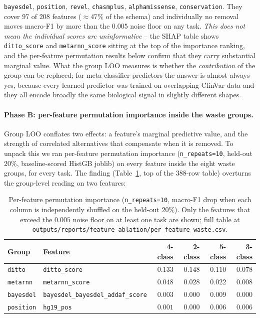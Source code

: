 \documentclass[11pt,a4paper]{article}
\begin{document}
\begin{enumerate}[leftmargin=*]
          \texttt{bayesdel}, \texttt{position}, \texttt{revel},
          \texttt{chasmplus}, \texttt{alphamissense}, \texttt{conservation}.
          They cover $97$ of $208$ features ($\approx 47\%$ of the schema)
          and individually no removal moves macro-F1 by more than the
          $0.005$ noise floor on any task. \emph{This does not mean the
          individual scores are uninformative} -- the SHAP table shows
          \texttt{ditto\_score} and \texttt{metarnn\_score} sitting at
          the top of the importance ranking, and the per-feature
          permutation results below confirm that they carry substantial
          marginal value. What the group LOO measures is whether the
          \emph{contribution} of the group can be replaced; for
          meta-classifier predictors the answer is almost always yes,
          because every learned predictor was trained on overlapping
          ClinVar data and they all encode broadly the same biological
          signal in slightly different shapes.
\end{enumerate}

\paragraph{Phase B: per-feature permutation importance inside the waste groups.}
Group LOO conflates two effects: a feature's marginal predictive value,
and the strength of correlated alternatives that compensate when it is
removed. To unpack this we ran per-feature permutation importance
(\texttt{n\_repeats=10}, held-out 20\%, baseline-scored HistGB joblib)
on every feature inside the eight waste groups, for every task. The
finding (Table~\ref{tab:ablation-perfeat}, top of the $388$-row table)
overturns the group-level reading on two features:

\begin{table}[H]
\centering
\caption{Per-feature permutation importance (\texttt{n\_repeats=10},
macro-F1 drop when each column is independently shuffled on the held-out
$20\%$). Only the features that exceed the $0.005$ noise floor on at
least one task are shown; full table at
\texttt{outputs/reports/feature\_ablation/per\_feature\_waste.csv}.}
\label{tab:ablation-perfeat}
\small
\begin{tabular}{llrrrr}
\toprule
Group & Feature & 4-class & 2-class & 5-class & 3-class \\
\midrule
\texttt{ditto}    & \texttt{ditto\_score}                   & $0.133$ & $0.148$ & $0.110$ & $0.078$ \\
\texttt{metarnn}  & \texttt{metarnn\_score}                 & $0.048$ & $0.028$ & $0.022$ & $0.008$ \\
\texttt{bayesdel} & \texttt{bayesdel\_bayesdel\_addaf\_score}& $0.003$ & $0.000$ & $0.009$ & $0.000$ \\
\texttt{position} & \texttt{hg19\_pos}                      & $0.001$ & $0.000$ & $0.006$ & $0.006$ \\
\bottomrule
\end{tabular}
\end{table}
\end{document}
